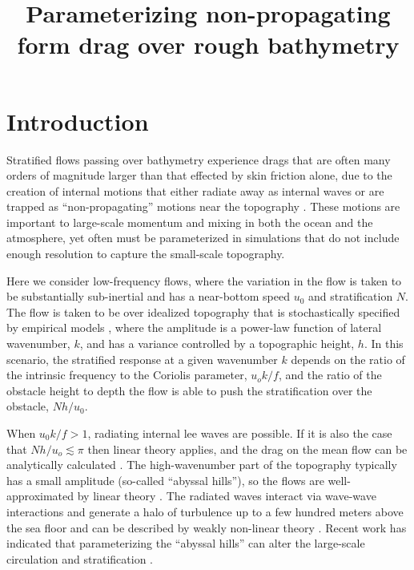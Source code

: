 \documentclass[twocol]{ametsocV5}
\title{Parameterizing non-propagating form drag over rough bathymetry}
\affiliation{University of Victoria, Victoria, BC, Canada}
\begin{document}
\maketitle

\section{Introduction}

Stratified flows passing over bathymetry experience drags that are often many orders of magnitude larger than that effected by skin friction alone, due to the creation of internal motions that either radiate away as internal waves \citep{bell75a} or are trapped as ``non-propagating'' motions near the topography \citep[i.e.][]{bacmeisterpierrhumbert88}. These motions are important to large-scale momentum and mixing in both the ocean and the atmosphere, yet often  must be parameterized in simulations that do not include enough resolution to capture the small-scale topography.

Here we consider low-frequency flows, where the variation in the flow is taken to be substantially sub-inertial and has a near-bottom speed $u_0$ and stratification $N$.    The flow is taken to be over idealized topography that is stochastically specified by empirical models \citep[e.g.][]{goffarbic10}, where the amplitude is a power-law function of lateral wavenumber, $k$, and has a variance controlled by a topographic height, $h$.  In this scenario, the stratified response at a given wavenumber $k$ depends on the ratio of the intrinsic frequency to the Coriolis parameter, $u_o k / f$, and the ratio of the obstacle height to depth the flow is able to push the stratification over the obstacle, $Nh/u_0$.

When $u_0k/f > 1$, radiating internal lee waves are possible.  If it is also the case that $Nh/u_o \lesssim \pi$ then linear theory applies, and the drag on the mean flow can be analytically calculated \citep{bell75a}.  The high-wavenumber part of the topography typically has a small amplitude (so-called ``abyssal hills''), so the flows are well-approximated by linear theory \citep{nikurashinferrari10a,nikurashinferrari14}.  The radiated waves interact via wave-wave interactions and generate a halo of turbulence up to a few hundred meters above the sea floor and can be described by weakly non-linear theory \citep{polzin09}.  Recent work has indicated that parameterizing the ``abyssal hills'' can alter the large-scale circulation and stratification \citep[i.e.]{meletetal13, de_Lavergne_2017}.
\end{document}
